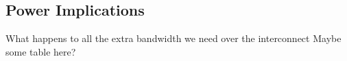 \subsection {Power Implications}

What happens to all the extra bandwidth we need over the interconnect
Maybe some table here?

% 
% 
% 

